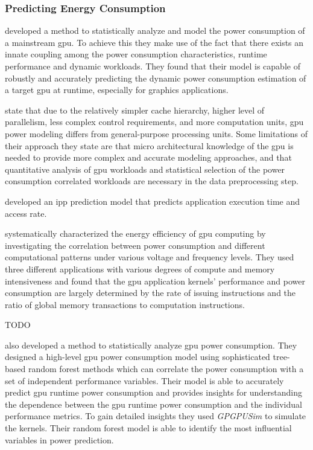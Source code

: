 			\subsubsection{Predicting Energy Consumption}
				\textcite{Ma2009} developed a method to statistically analyze and model the power consumption of a mainstream \gls{gpu}.
				To achieve this they make use of the fact that there exists an innate coupling among the power consumption characteristics, runtime performance and dynamic workloads.
				They found that their model is capable of robustly and accurately predicting the dynamic power consumption estimation of a target \gls{gpu} at runtime, especially for graphics applications.
				
				\textcite{Ma2009} state that due to the relatively simpler cache hierarchy, higher level of parallelism, less complex control requirements, and more computation units, \gls{gpu} power modeling differs from general-purpose processing units.
				Some limitations of their approach they state are that micro architectural knowledge of the \gls{gpu} is needed to provide more complex and accurate modeling approaches, and that quantitative analysis of \gls{gpu} workloads and statistical selection of the power consumption correlated workloads are necessary in the data preprocessing step.

				\textcite{Hong2010} developed an \gls{ipp} prediction model that predicts application execution time and access rate.

				\textcite{Jiao2010} systematically characterized the energy efficiency of \gls{gpu} computing by investigating the correlation between power consumption and different computational patterns under various voltage and frequency levels.
				They used three different applications with various degrees of compute and memory intensiveness and found that the \gls{gpu} application kernels' performance and power consumption are largely determined by the rate of issuing instructions and the ratio of global memory transactions to computation instructions.

				\textcite{Nagasaka2010} TODO

				\textcite{Chen2011} also developed a method to statistically analyze \gls{gpu} power consumption.
				They designed a high-level \gls{gpu} power consumption model using sophisticated tree-based random forest methods which can correlate the power consumption with a set of independent performance variables.
				Their model is able to accurately predict \gls{gpu} runtime power consumption and provides insights for understanding the dependence between the \gls{gpu} runtime power consumption and the individual performance metrics.
				To gain detailed insights they used \emph{GPGPUSim} \parencite{Bakhoda2009} to simulate the kernels.
				Their random forest model is able to identify the most influential variables in power prediction.

